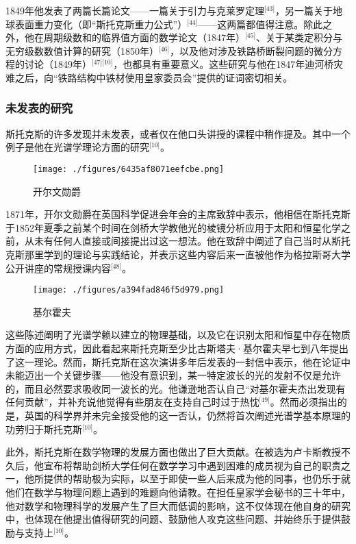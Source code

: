 1849年他发表了两篇长篇论文——一篇关于引力与克莱罗定理\(^\text{[43]}\)，另一篇关于地球表面重力变化（即“斯托克斯重力公式”）\(^\text{[44]}\)——这两篇都值得注意。除此之外，他在周期级数和的临界值方面的数学论文（1847年）\(^\text{[45]}\)、关于某类定积分与无穷级数数值计算的研究（1850年）\(^\text{[46]}\)，以及他对涉及铁路桥断裂问题的微分方程的讨论（1849年）\(^\text{[47][10]}\)，也都具有重要意义。这些研究与他在1847年迪河桥灾难之后，向“铁路结构中铁材使用皇家委员会”提供的证词密切相关。
\subsubsection{未发表的研究}
斯托克斯的许多发现并未发表，或者仅在他口头讲授的课程中稍作提及。其中一个例子是他在光谱学理论方面的研究\(^\text{[10]}\)。
\begin{figure}[ht]
\centering
\texttt{[image: ./figures/6435af8071eefcbe.png]}
\caption{开尔文勋爵} \label{fig_QZstks_6}
\end{figure}
1871年，开尔文勋爵在英国科学促进会年会的主席致辞中表示，他相信在斯托克斯于1852年夏季之前某个时间在剑桥大学教他光的棱镜分析应用于太阳和恒星化学之前，从未有任何人直接或间接提出过这一想法。他在致辞中阐述了自己当时从斯托克斯那里学到的理论与实践结论，并表示这些内容后来一直被他作为格拉斯哥大学公开讲座的常规授课内容\(^\text{[48]}\)。
\begin{figure}[ht]
\centering
\texttt{[image: ./figures/a394fad846f5d979.png]}
\caption{基尔霍夫} \label{fig_QZstks_7}
\end{figure}
这些陈述阐明了光谱学赖以建立的物理基础，以及它在识别太阳和恒星中存在物质方面的应用方式，因此看起来斯托克斯至少比古斯塔夫·基尔霍夫早七到八年提出了这一理论。然而，斯托克斯在这次演讲多年后发表的一封信中表示，他在论证中未能迈出一个关键步骤——他没有意识到，某一特定波长的光的发射不仅是允许的，而且必然要求吸收同一波长的光。他谦逊地否认自己“对基尔霍夫杰出发现有任何贡献”，并补充说他觉得有些朋友在支持自己时过于热忱\(^\text{[49]}\)。然而必须指出的是，英国的科学界并未完全接受他的这一否认，仍然将首次阐述光谱学基本原理的功劳归于斯托克斯\(^\text{[10]}\)。

此外，斯托克斯在数学物理的发展方面也做出了巨大贡献。在被选为卢卡斯教授不久后，他宣布将帮助剑桥大学任何在数学学习中遇到困难的成员视为自己的职责之一，他所提供的帮助极为实际，以至于即使一些人后来成为他的同事，也仍乐于就他们在数学与物理问题上遇到的难题向他请教。在担任皇家学会秘书的三十年中，他对数学和物理科学的发展产生了巨大而低调的影响，这不仅体现在他自身的研究中，也体现在他提出值得研究的问题、鼓励他人攻克这些问题、并始终乐于提供鼓励与支持上\(^\text{[10]}\)。

